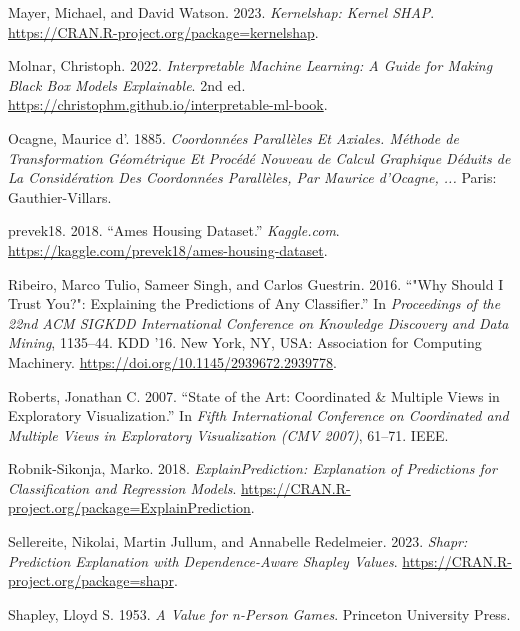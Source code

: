 \documentclass[
]{article}
\newlength{\cslhangindent}
\newlength{\cslentryspacingunit} %
\newenvironment{CSLReferences}[2] %
 {%
  \setlength{\parindent}{0pt}
  \ifodd #1
  \let\oldpar\par
  \def\par{\hangindent=\cslhangindent\oldpar}
  \fi
  \setlength{\parskip}{#2\cslentryspacingunit}
 }%
 {}
\begin{document}
\begin{CSLReferences}{1}{0}
\leavevmode{}%
Mayer, Michael, and David Watson. 2023. \emph{Kernelshap: Kernel SHAP}. \url{https://CRAN.R-project.org/package=kernelshap}.

\leavevmode{}%
Molnar, Christoph. 2022. \emph{Interpretable Machine Learning: A Guide for Making Black Box Models Explainable}. 2nd ed. \url{https://christophm.github.io/interpretable-ml-book}.

\leavevmode{}%
Ocagne, Maurice d'. 1885. \emph{Coordonnées Parallèles Et Axiales. {Méthode} de Transformation Géométrique Et Procédé Nouveau de Calcul Graphique Déduits de La Considération Des Coordonnées Parallèles, Par {Maurice} d'{Ocagne}, ...} Paris: Gauthier-Villars.

\leavevmode{}%
prevek18. 2018. {``Ames {Housing} {Dataset}.''} \emph{Kaggle.com}. \url{https://kaggle.com/prevek18/ames-housing-dataset}.

\leavevmode{}%
Ribeiro, Marco Tulio, Sameer Singh, and Carlos Guestrin. 2016. {``"{Why} {Should} {I} {Trust} {You}?": {Explaining} the {Predictions} of {Any} {Classifier}.''} In \emph{Proceedings of the 22nd {ACM} {SIGKDD} {International} {Conference} on {Knowledge} {Discovery} and {Data} {Mining}}, 1135--44. {KDD} '16. New York, NY, USA: Association for Computing Machinery. \url{https://doi.org/10.1145/2939672.2939778}.

\leavevmode{}%
Roberts, Jonathan C. 2007. {``State of the Art: {Coordinated} \& Multiple Views in Exploratory Visualization.''} In \emph{Fifth International Conference on Coordinated and Multiple Views in Exploratory Visualization ({CMV} 2007)}, 61--71. IEEE.

\leavevmode{}%
Robnik-Sikonja, Marko. 2018. \emph{ExplainPrediction: Explanation of Predictions for Classification and Regression Models}. \url{https://CRAN.R-project.org/package=ExplainPrediction}.

\leavevmode{}%
Sellereite, Nikolai, Martin Jullum, and Annabelle Redelmeier. 2023. \emph{Shapr: Prediction Explanation with Dependence-Aware Shapley Values}. \url{https://CRAN.R-project.org/package=shapr}.

\leavevmode{}%
Shapley, Lloyd S. 1953. \emph{A Value for n-Person Games}. Princeton University Press.


\end{CSLReferences}
\end{document}
